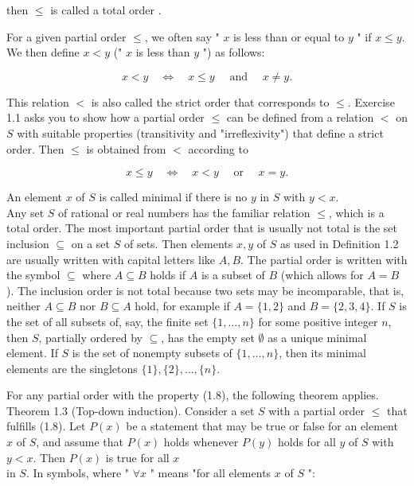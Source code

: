 \documentclass[12pt]{article}
\begin{document}
then $\leq$ is called a total order .

For a given partial order $\leq$, we often say " $x$ is less than or equal to $y$ " if $x \leq y$. We then define $x<y$ (" $x$ is less than $y$ ") as follows:


\begin{equation*}
x<y \quad \Leftrightarrow \quad x \leq y \quad \text { and } \quad x \neq y . \tag{1.6}
\end{equation*}


This relation $<$ is also called the strict order that corresponds to $\leq$. Exercise 1.1 asks you to show how a partial order $\leq$ can be defined from a relation $<$ on $S$ with suitable properties (transitivity and "irreflexivity") that define a strict order. Then $\leq$ is obtained from $<$ according to


\begin{equation*}
x \leq y \quad \Leftrightarrow \quad x<y \quad \text { or } \quad x=y . \tag{1.7}
\end{equation*}


An element $x$ of $S$ is called minimal if there is no $y$ in $S$ with $y<x$.\\
Any set $S$ of rational or real numbers has the familiar relation $\leq$, which is a total order. The most important partial order that is usually not total is the set inclusion $\subseteq$ on a set $S$ of sets. Then elements $x, y$ of $S$ as used in Definition 1.2 are usually written with capital letters like $A, B$. The partial order is written with the symbol $\subseteq$ where $A \subseteq B$ holds if $A$ is a subset of $B$ (which allows for $A=B$ ). The inclusion order is not total because two sets may be incomparable, that is, neither $A \subseteq B$ nor $B \subseteq A$ hold, for example if $A=\{1,2\}$ and $B=\{2,3,4\}$. If $S$ is the set of all subsets of, say, the finite set $\{1, \ldots, n\}$ for some positive integer $n$, then $S$, partially ordered by $\subseteq$, has the empty set $\emptyset$ as a unique minimal element. If $S$ is the set of nonempty subsets of $\{1, \ldots, n\}$, then its minimal elements are the singletons $\{1\},\{2\}, \ldots,\{n\}$.

For any partial order with the property (1.8), the following theorem applies.\\
Theorem 1.3 (Top-down induction). Consider a set $S$ with a partial order $\leq$ that fulfills (1.8). Let $P(x)$ be a statement that may be true or false for an element $x$ of $S$, and assume that $P(x)$ holds whenever $P(y)$ holds for all $y$ of $S$ with $y<x$. Then $P(x)$ is true for all $x$\\
in $S$. In symbols, where " $\forall x$ " means "for all elements $x$ of $S$ ":
\end{document}
